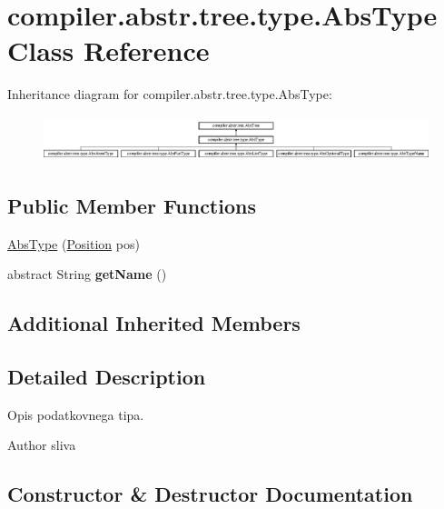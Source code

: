 \hypertarget{classcompiler_1_1abstr_1_1tree_1_1type_1_1_abs_type}{}\section{compiler.\+abstr.\+tree.\+type.\+Abs\+Type Class Reference}
\label{classcompiler_1_1abstr_1_1tree_1_1type_1_1_abs_type}
Inheritance diagram for compiler.\+abstr.\+tree.\+type.\+Abs\+Type\+:\begin{figure}[H]
\begin{center}
\leavevmode
\includegraphics[height=1.317647cm]{classcompiler_1_1abstr_1_1tree_1_1type_1_1_abs_type}
\end{center}
\end{figure}
\subsection*{Public Member Functions}
\begin{DoxyCompactItemize}
\item 
\hyperlink{classcompiler_1_1abstr_1_1tree_1_1type_1_1_abs_type_a64811f8d0e3e5e77f13c51aed4ec9343}{Abs\+Type} (\hyperlink{classcompiler_1_1_position}{Position} pos)
\item 
\mbox{\label{classcompiler_1_1abstr_1_1tree_1_1type_1_1_abs_type_a8a4322a5e47357fec094931dc85ec9b8}} 
abstract String {\bfseries get\+Name} ()
\end{DoxyCompactItemize}
\subsection*{Additional Inherited Members}


\subsection{Detailed Description}
Opis podatkovnega tipa.

\begin{DoxyAuthor}{Author}
sliva 
\end{DoxyAuthor}


\subsection{Constructor \& Destructor Documentation}
\mbox{\label{classcompiler_1_1abstr_1_1tree_1_1type_1_1_abs_type_a64811f8d0e3e5e77f13c51aed4ec9343}} 
